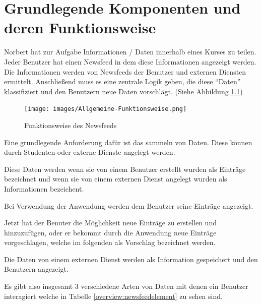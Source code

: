 
\chapter{Grundlegende Komponenten und deren Funktionsweise}
Norbert hat zur Aufgabe Informationen / Daten innerhalb eines Kurses zu teilen.
Jeder Benutzer hat einen Newsfeed in dem diese Informationen angezeigt werden.
Die Informationen werden von Newsfeeds der Benutzer und externen Diensten ermittelt.
Anschließend muss es eine zentrale Logik geben, die diese \enquote{Daten} klassifiziert und den 
Benutzern neue Daten vorschlägt. (Siehe Abbildung \ref{overview:general-function})

\begin{figure}[H]
    \centering
    \texttt{[image: images/Allgemeine-Funktionsweise.png]}
    \caption{Funktionsweise des Newsfeeds}\label{overview:general-function}
\end{figure}

Eine grundlegende Anforderung dafür ist das sammeln von Daten.
Diese können durch Studenten oder externe Dienste angelegt werden.

Diese Daten werden wenn sie von einem Benutzer erstellt wurden als Einträge bezeichnet 
und wenn sie von einem externen Dienst angelegt wurden als Informationen bezeichent.

Bei Verwendung der Anwendung werden dem Benutzer seine Einträge angezeigt.

Jetzt hat der Benuter die Möglichkeit neue Einträge zu erstellen und hinzuzufügen,
oder er bekommt durch die Anwendung neue Einträge vorgeschlagen, welche im folgenden als Vorschlag bezeichnet werden.

Die Daten von einem externen Dienst werden als Information gespeichert und den Benutzern angezeigt.

Es gibt also insgesamt 3 verschiedene Arten von Daten mit denen ein Benutzer interagiert welche in Tabelle \ref{overview:newsfeedelement}
zu sehen sind.

